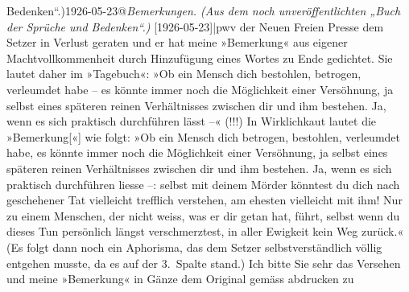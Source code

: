 \begin{ledgroupsized}[t]{13cm}
{                  Bedenken“.)1926-05-23@\strich\emph{Bemerkungen. (Aus dem noch unveröffentlichten „Buch der Sprüche und Bedenken“.)} {[}1926-05-23{]}|pwv} der Neuen Freien Presse
               dem Setzer in Verlust geraten und er hat meine »Bemerkung« aus eigener
               Machtvollkommenheit durch Hinzufügung eines Wortes zu Ende gedichtet. Sie lautet
               daher im »Tagebuch«: »Ob ein Mensch dich
               bestohlen, betrogen, verleumdet habe – es könnte immer noch die Möglichkeit einer
               Versöhnung, ja selbst eines späteren reinen Verhältnisses zwischen dir und ihm
               bestehen. Ja, wenn es sich praktisch durchführen lässt –« (!!!)\pend
           \pstart
           In Wirklichkaut lautet die »Bemerkung{[}«{]} wie folgt:\pend
           \pstart
           »Ob ein Mensch dich betrogen, bestohlen, 
               verleumdet habe, es könnte immer noch die Möglichkeit einer Versöhnung, ja selbst
               eines späteren reinen Verhältnisses zwischen dir und ihm bestehen. Ja, wenn es sich
               praktisch durchführen liesse –: selbst mit deinem
               Mörder könntest du dich nach geschehener Tat vielleicht trefflich verstehen, am
               ehesten vielleicht mit ihm! Nur {\pb}zu einem Menschen, der
               nicht weiss, was er dir getan hat, führt, selbst wenn du dieses Tun persönlich längst
               verschmerztest, in aller Ewigkeit kein Weg zurück.«\pend
           \pstart
           (Es folgt dann noch ein Aphorisma, das dem Setzer selbstverständlich völlig entgehen
               musste, da es auf der 3. Spalte stand.)\pend
           \pstart
           Ich bitte Sie sehr das Versehen \label{K_L02476-1v}\label{K_L02476-1h} und meine »Bemerkung« in Gänze dem Original gemäss abdrucken zu

\end{ledgroupsized}
